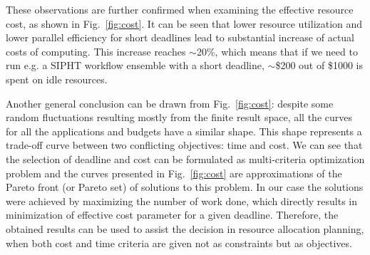 \documentclass{sig-alternate}
\begin{document}
These observations are further confirmed when examining the effective resource
cost, as shown in Fig.~\ref{fig:cost}. It can be seen that lower resource
utilization and lower parallel efficiency for short deadlines lead to
substantial increase of actual costs of computing. This increase reaches
$\sim$20\%, which means that if we need to run e.g. a SIPHT workflow ensemble
with a short deadline, $\sim$\$200 out of \$1000 is spent on idle resources.

Another general conclusion can be drawn from Fig.~\ref{fig:cost}: despite some
random fluctuations resulting mostly from the finite result space, all the
curves for all the applications and budgets have a similar shape. This shape
represents a trade-off curve between two conflicting objectives: time and cost.
We can see that the selection of deadline and cost can be formulated as
multi-criteria optimization problem and the curves presented in
Fig.~\ref{fig:cost} are approximations of the Pareto front (or Pareto set) of
solutions to this problem. In our case the solutions were achieved by maximizing
the number of work done, which directly results in minimization of effective cost parameter for a given
deadline. Therefore, the obtained results can be used to assist the decision in
resource allocation planning, when both cost and time criteria are given not as
constraints but as objectives.


       
\end{document}
